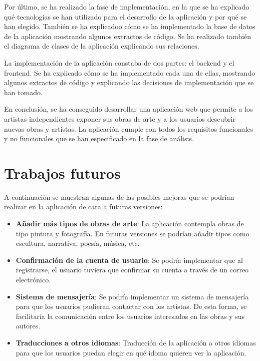 \vspace{0.5cm}

Por último, se ha realizado la fase de implementación, en la que se ha explicado qué
tecnologías se han utilizado para el desarrollo de la aplicación y por qué se han
elegido. También se ha explicadoo cómo se ha implementado la base de datos de la aplicación
mostrando algunos extractos de código. Se ha realizado también el diagrama de clases
de la aplicación explicando sus relaciones.

La implementación de la aplicación constaba de dos partes: el backend y el frontend. Se ha
explicado cómo se ha implementado cada una de ellas, mostrando algunos extractos de código
y explicando las decisiones de implementación que se han tomado.

\vspace{0.5cm}

En conclusión, se ha conseguido desarrollar una aplicación web que permite a los artistas
independientes exponer sus obras de arte y a los usuarios descubrir nuevas obras y artistas.
La aplicación cumple con todos los requisitos funcionales y no funcionales que se han
especificado en la fase de análisis.

\section{Trabajos futuros}

A continuación se muestran algunas de las posibles mejoras que se podrían realizar en
la aplicación de cara a futuras versiones:

\begin{itemize}
    \item \textbf{Añadir más tipos de obras de arte}: La aplicación contempla obras de tipo
    pintura y fotografía. En futuras versiones se podrían añadir tipos como escultura,
    narrativa, poesía, música, etc.
    \item \textbf{Confirmación de la cuenta de usuario}: Se podría implementar que al
    registrarse, el usuario tuviera que confirmar su cuenta a través de un correo electrónico.
    \item \textbf{Sistema de mensajería}: Se podría implementar un sistema de mensajería
    para que los usuarios pudieran contactar con los artistas. De esta forma, se facilitaría
    la comunicación entre los usuarios interesados en las obras y sus autores.
    \item \textbf{Traducciones a otros idiomas}: Traducción de la aplicación a otros idiomas
    para que los usuarios puedan elegir en qué idoma quieren ver la aplicación.
\end{itemize}